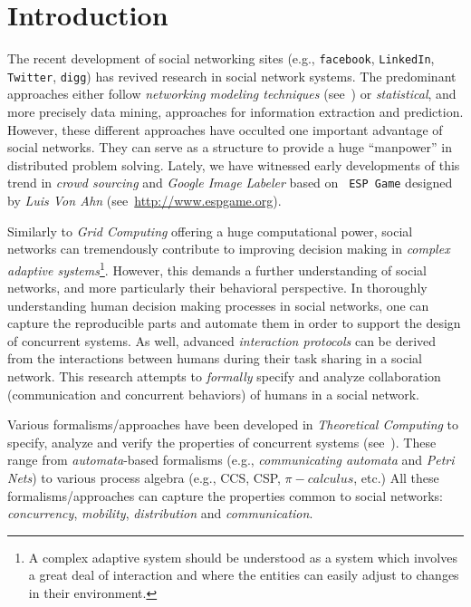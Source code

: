 \section{Introduction} %
\label{sec:introduction}

The recent development of social networking sites (e.g., {\tt facebook}, {\tt LinkedIn}, {\tt Twitter}, {\tt digg}) has
revived research in social network systems. The predominant approaches either follow \emph{networking modeling
techniques} (see~\cite{Berkowitz-Wellman:88}) or \emph{statistical}, and more precisely data mining, approaches for
information extraction and prediction. However, these different approaches have occulted one important advantage of
social networks. They can serve as a structure to provide a huge ``manpower'' in distributed problem solving. Lately, we
have witnessed early developments of this trend in \emph{crowd sourcing} and \emph{Google Image Labeler} based on {\tt
ESP Game} designed by \emph{Luis Von Ahn} (see~\url{http://www.espgame.org}).

Similarly to \emph{Grid Computing} offering a huge computational power, social networks can tremendously contribute to
improving decision making in \emph{complex adaptive systems}\footnote{A complex adaptive system should be understood as a
system which involves a great deal of interaction and where the entities can easily adjust to changes in their
environment.}. However, this demands a further understanding of social networks, and more particularly their behavioral
perspective. In thoroughly understanding human decision making processes in social networks, one can capture the
reproducible parts and automate them in order to support the design of concurrent systems. As well, advanced
\emph{interaction protocols} can be derived from the interactions between humans during their task sharing in a social
network. This research attempts to \emph{formally} specify and analyze collaboration (communication and concurrent
behaviors) of humans in a social network.

Various formalisms/approaches have been developed in \emph{Theoretical Computing} to specify, analyze and verify the
properties of concurrent systems (see~\cite{Winskel-Nielsen:95}). These range from \emph{automata}-based formalisms
(e.g., \emph{communicating automata} and \emph{Petri Nets}) to various process algebra (e.g., CCS, CSP, $\pi-calculus$,
etc.) All these formalisms/approaches can capture the properties common to social networks: \emph{concurrency},
\emph{mobility}, \emph{distribution} and \emph{communication}.

